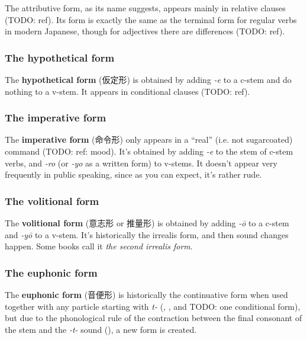 \documentclass[UTF8, a4paper, oneside, scheme=plain]{ctexrep}
\newcommand*{\concept}[1]{\textbf{#1}}
\newcommand*{\term}[1]{\emph{#1}}
\newcommand{\corpus}[1]{\emph{#1}}
\begin{document}
The attributive form, as its name suggests, appears mainly in relative clauses (TODO: ref).
Its form is exactly the same as the terminal form for regular verbs in modern Japanese,
though for adjectives there are differences (TODO: ref).

\subsubsection{The hypothetical form}

The \concept{hypothetical form} (仮定形) is obtained by adding \corpus{-e} to a c-stem and do nothing to a v-stem.
It appears in conditional clauses (TODO: ref).

\subsubsection{The imperative form}\label{sec:imperative-form}

The \concept{imperative form} (命令形) only appears in a ``real'' (i.e. not sugarcoated) command (TODO: ref: mood).
It's obtained by adding \corpus{-e} to the stem of c-stem verbs,
and \corpus{-ro} (or \corpus{-yo} as a written form) to v-stems.
It doesn't appear very frequently in public speaking, 
since as you can expect, 
it's rather rude.

\subsubsection{The volitional form}\label{sec:volition-form}

The \concept{volitional form} (意志形 or 推量形)
is obtained by adding \corpus{-\={o}} to a c-stem and \corpus{-y\={o}} to a v-stem.
It's historically the irrealis form,
and then sound changes happen.
Some books call it \term{the second irrealis form}.


\subsubsection{The euphonic form}\label{sec:euphonic-form}

The \concept{euphonic form} (音便形) is 
historically the continuative form when used together with any particle starting with \corpus{t-}
(, , and TODO: one conditional form),
but due to the phonological rule of the contraction 
between the final consonant of the stem and the \corpus{-t-} sound (),
a new form is created. 
\end{document}
